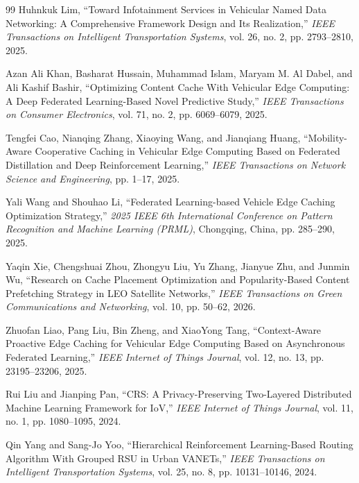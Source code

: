 \documentclass[journal]{IEEEtran}
\begin{document}
\begin{thebibliography}{99}
Huhnkuk Lim, ``Toward Infotainment Services in Vehicular Named Data Networking: A Comprehensive Framework Design and Its Realization,'' \emph{IEEE Transactions on Intelligent Transportation Systems}, vol. 26, no. 2, pp. 2793--2810, 2025.%

Azan Ali Khan, Basharat Hussain, Muhammad Islam, Maryam M. Al Dabel, and Ali Kashif Bashir, ``Optimizing Content Cache With Vehicular Edge Computing: A Deep Federated Learning-Based Novel Predictive Study,'' \emph{IEEE Transactions on Consumer Electronics}, vol. 71, no. 2, pp. 6069--6079, 2025.%

Tengfei Cao, Nianqing Zhang, Xiaoying Wang, and Jianqiang Huang, ``Mobility-Aware Cooperative Caching in Vehicular Edge Computing Based on Federated Distillation and Deep Reinforcement Learning,'' \emph{IEEE Transactions on Network Science and Engineering}, pp. 1--17, 2025.%

Yali Wang and Shouhao Li, ``Federated Learning-based Vehicle Edge Caching Optimization Strategy,'' \emph{2025 IEEE 6th International Conference on Pattern Recognition and Machine Learning (PRML)}, Chongqing, China, pp. 285--290, 2025.%

Yaqin Xie, Chengshuai Zhou, Zhongyu Liu, Yu Zhang, Jianyue Zhu, and Junmin Wu, ``Research on Cache Placement Optimization and Popularity-Based Content Prefetching Strategy in LEO Satellite Networks,'' \emph{IEEE Transactions on Green Communications and Networking}, vol. 10, pp. 50--62, 2026.%

Zhuofan Liao, Pang Liu, Bin Zheng, and XiaoYong Tang, ``Context-Aware Proactive Edge Caching for Vehicular Edge Computing Based on Asynchronous Federated Learning,'' \emph{IEEE Internet of Things Journal}, vol. 12, no. 13, pp. 23195--23206, 2025.%

Rui Liu and Jianping Pan, ``CRS: A Privacy-Preserving Two-Layered Distributed Machine Learning Framework for IoV,'' \emph{IEEE Internet of Things Journal}, vol. 11, no. 1, pp. 1080--1095, 2024.%

Qin Yang and Sang-Jo Yoo, ``Hierarchical Reinforcement Learning-Based Routing Algorithm With Grouped RSU in Urban VANETs,'' \emph{IEEE Transactions on Intelligent Transportation Systems}, vol. 25, no. 8, pp. 10131--10146, 2024.%


\end{thebibliography}
\end{document}
